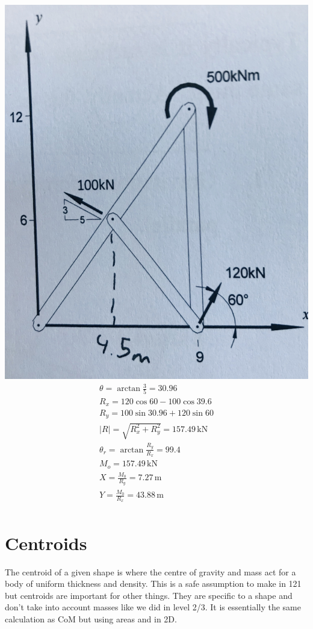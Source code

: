 \documentclass[a4paper, 12pt]{article}
\newcommand{\unit}[1]{\ensuremath{\, \mathrm{#1}}}
\begin{document}
\begin{center}
\includegraphics[scale=0.04]{4}
\begin{gather*}
    \theta = \arctan{\frac{3}{5}} = 30.96 \\
    R_x = 120\cos{60} - 100\cos{39.6} \\
    R_y = 100\sin{30.96} + 120\sin{60} \\
    |R| = \sqrt{R_x^2+R_y^2} = 157.49\unit{kN} \\
    \theta_r = \arctan{\frac{R_y}{R_x}} = 99.4 \\
    M_o = 157.49\unit{kN} \\
    X = \frac{M_0}{R_y} = 7.27\unit{m} \\
    Y = \frac{M_0}{R_x} = 43.88\unit{m} \\
\end{gather*}
\end{center}
\newpage

\section{Centroids}
The centroid of a given shape is where the centre of gravity and mass act for a body of uniform thickness and density.
This is a safe assumption to make in 121 but centroids are important for other things. 
They are specific to a shape and don't take into account masses like we did in level 2/3. 
It is essentially the same calculation as CoM but using areas and in 2D. 
\end{document}
